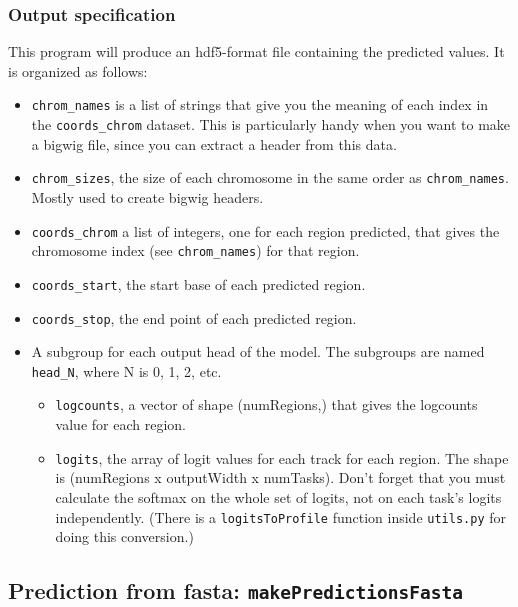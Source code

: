 \documentclass{article}
\begin{document}
\subsubsection{Output specification}

This program will produce an hdf5-format file containing the predicted values.
It is organized as follows:

\begin{itemize}
    \item \texttt{chrom\_names} is a list of strings that give you the meaning
        of each index in the \texttt{coords\_chrom} dataset.
        This is particularly handy when you want to make a bigwig file, since
        you can extract a header from this data.
    \item \texttt{chrom\_sizes}, the size of each chromosome in the same order
        as \texttt{chrom\_names}.
        Mostly used to create bigwig headers.
    \item \texttt{coords\_chrom} a list of integers, one for each region
        predicted, that gives the chromosome index (see \texttt{chrom\_names})
        for that region.
    \item \texttt{coords\_start}, the start base of each predicted region.
    \item \texttt{coords\_stop}, the end point of each predicted region.
    \item A subgroup for each output head of the model. The subgroups are named
        \texttt{head\_N}, where N is 0, 1, 2, etc.
        \begin{itemize}
            \item \texttt{logcounts}, a vector of shape (numRegions,) that gives
                the logcounts value for each region.
            \item \texttt{logits}, the array of logit values for each track for
                each region.
                The shape is (numRegions x outputWidth x numTasks).
                Don't forget that you must calculate the softmax on the whole
                set of logits, not on each task's logits independently.
                (There is a \texttt{logitsToProfile} function inside
                \texttt{utils.py} for doing this conversion.)
        \end{itemize}

\end{itemize}


\newpage

\subsection{Prediction from fasta: \texttt{makePredictionsFasta}}\label{prog:makePredictionsFasta}
\end{document}
